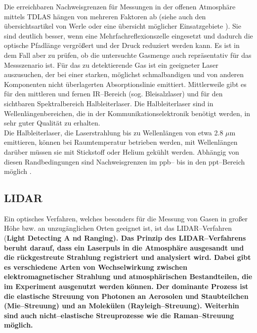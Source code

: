 Die erreichbaren Nachweisgrenzen für Messungen in der offenen
Atmosphäre mittels TDLAS hängen von mehreren Faktoren ab (siehe
auch den übersichtsartikel von Werle \cite{werle98} oder eine
übersicht möglicher Einsatzgebiete \cite{grisar92} ). Sie sind
deutlich besser, wenn eine Mehrfachreflexionszelle eingesetzt und
dadurch die optische Pfadlänge vergrö{\ss}ert und der Druck reduziert
werden kann. Es ist in dem Fall aber zu prüfen, ob die untersuchte
Gasmenge auch repräsentativ für das Messszenario ist. Für das zu
detektierende Gas ist ein geeigneter Laser auszusuchen, der bei
einer starken, möglichst schmalbandigen und von anderen
Komponenten nicht überlagerten Absorptionslinie emittiert.
Mittlerweile gibt es für den mittleren und fernen IR--Bereich
(sog. Bleisalzlaser) und für den sichtbaren Spektralbereich
Halbleiterlaser. Die Halbleiterlaser sind in
Wellenlängenbereichen, die in der Kommunikationselektronik
benötigt werden, in sehr guter Qualität zu erhalten.\\

Die Halbleiterlaser, die Laserstrahlung bis zu Wellenlängen von
etwa 2.8 $\mu$m emittieren, können bei Raumtemperatur betrieben
werden, mit Wellenlängen darüber müssen sie mit Stickstoff oder
Helium gekühlt werden. Abhängig von diesen Randbedingungen sind
Nachweisgrenzen im ppb-- bis in den ppt--Bereich möglich
\cite{werle98}.


\subsection{\label{lidar}LIDAR}

Ein optisches Verfahren, welches besonders für die Messung von
Gasen in gro{\ss}er Höhe bzw. an unzugänglichen Orten geeignet ist,
ist das LIDAR--Verfahren (\bf L\rm ight \bf D\rm etecting \bf A\rm
nd \bf R\rm anging). Das Prinzip des LIDAR--Verfahrens beruht
darauf, dass ein Laserpuls in die Atmosphäre ausgesandt und die
rückgestreute Strahlung registriert und analysiert wird. Dabei
gibt es verschiedene Arten von Wechselwirkung zwischen
elektromagnetischer Strahlung und atmosphärischen Bestandteilen,
die im Experiment ausgenutzt werden können. Der dominante Prozess
ist die elastische Streuung von Photonen an Aerosolen und
Staubteilchen (Mie--Streuung) und an Molekülen
(Rayleigh--Streuung). Weiterhin sind auch nicht--elastische
Streuprozesse wie die Raman--Streuung möglich.\\

